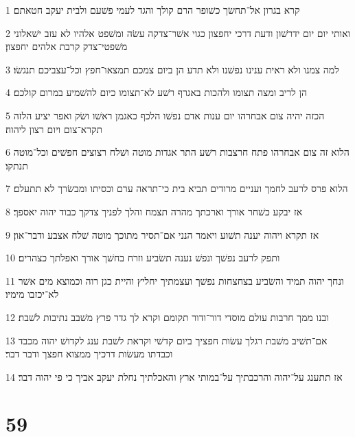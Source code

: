 \par 1 קרא בגרון אל־תחשׂך כשׁופר הרם קולך והגד לעמי פשׁעם ולבית יעקב חטאתם׃
\par 2 ואותי יום יום ידרשׁון ודעת דרכי יחפצון כגוי אשׁר־צדקה עשׂה ומשׁפט אלהיו לא עזב ישׁאלוני משׁפטי־צדק קרבת אלהים יחפצון׃
\par 3 למה צמנו ולא ראית ענינו נפשׁנו ולא תדע הן ביום צמכם תמצאו־חפץ וכל־עצביכם תנגשׂו׃
\par 4 הן לריב ומצה תצומו ולהכות באגרף רשׁע לא־תצומו כיום להשׁמיע במרום קולכם׃
\par 5 הכזה יהיה צום אבחרהו יום ענות אדם נפשׁו הלכף כאגמן ראשׁו ושׂק ואפר יציע הלזה תקרא־צום ויום רצון ליהוה׃
\par 6 הלוא זה צום אבחרהו פתח חרצבות רשׁע התר אגדות מוטה ושׁלח רצוצים חפשׁים וכל־מוטה תנתקו׃
\par 7 הלוא פרס לרעב לחמך ועניים מרודים תביא בית כי־תראה ערם וכסיתו ומבשׂרך לא תתעלם׃
\par 8 אז יבקע כשׁחר אורך וארכתך מהרה תצמח והלך לפניך צדקך כבוד יהוה יאספך׃
\par 9 אז תקרא ויהוה יענה תשׁוע ויאמר הנני אם־תסיר מתוכך מוטה שׁלח אצבע ודבר־און׃
\par 10 ותפק לרעב נפשׁך ונפשׁ נענה תשׂביע וזרח בחשׁך אורך ואפלתך כצהרים׃
\par 11 ונחך יהוה תמיד והשׂביע בצחצחות נפשׁך ועצמתיך יחליץ והיית כגן רוה וכמוצא מים אשׁר לא־יכזבו מימיו׃
\par 12 ובנו ממך חרבות עולם מוסדי דור־ודור תקומם וקרא לך גדר פרץ משׁבב נתיבות לשׁבת׃
\par 13 אם־תשׁיב משׁבת רגלך עשׂות חפציך ביום קדשׁי וקראת לשׁבת ענג לקדושׁ יהוה מכבד וכבדתו מעשׂות דרכיך ממצוא חפצך ודבר דבר׃
\par 14 אז תתענג על־יהוה והרכבתיך על־במותי ארץ והאכלתיך נחלת יעקב אביך כי פי יהוה דבר׃

\chapter{59}

